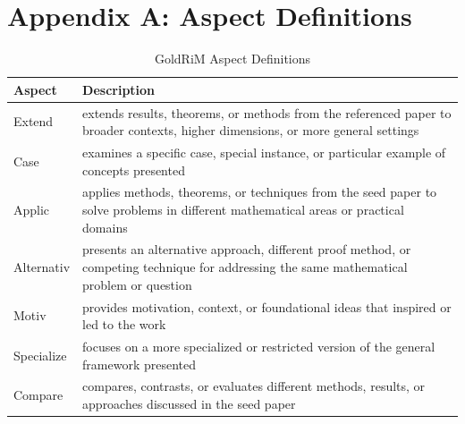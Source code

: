 \documentclass[sigconf,anonymous]{acmart}
\begin{document}
\section*{Appendix A: Aspect Definitions}
\label{Appendix:aspects}

\begin{table}[h]
\centering
\caption{GoldRiM Aspect Definitions}
\label{tab:goldrim_aspects}
\small
\begin{tabular}{p{2.5cm}p{12cm}}
\hline
\textbf{Aspect} & \textbf{Description} \\
\hline
Extend & extends results, theorems, or methods from the referenced paper to broader contexts, higher dimensions, or more general settings \\
\hline
Case & examines a specific case, special instance, or particular example of concepts presented \\
\hline
Applic & applies methods, theorems, or techniques from the seed paper to solve problems in different mathematical areas or practical domains \\
\hline
Alternativ & presents an alternative approach, different proof method, or competing technique for addressing the same mathematical problem or question \\
\hline
Motiv & provides motivation, context, or foundational ideas that inspired or led to the work \\
\hline
Specialize & focuses on a more specialized or restricted version of the general framework presented \\
\hline
Compare & compares, contrasts, or evaluates different methods, results, or approaches discussed in the seed paper \\
\hline
\end{tabular}
\end{table}
\end{document}
